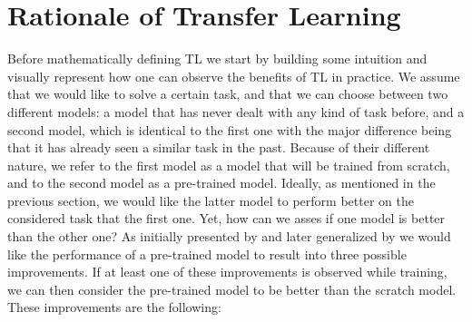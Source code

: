 \section{Rationale of Transfer Learning}
\label{sec:rationale}

Before mathematically defining TL we start by building some intuition and visually represent how one can observe the benefits of TL in practice. We assume that we would like to solve a certain task, and that we can choose between two different models: a model that has never dealt with any kind of task before, and a second model, which is identical to the first one with the major difference being that it has already seen a similar task in the past. Because of their different nature, we refer to the first model as a model that will be trained from scratch, and to the second model as a pre-trained model. Ideally, as mentioned in the previous section, we would like the latter model to perform better on the considered task that the first one. Yet, how can we asses if one model is better than the other one? As initially presented by \citet{langley2006transfer} and later generalized by \citet{lazaric2012transfer} we would like the performance of a pre-trained model to result into three possible improvements. If at least one of these improvements is observed while training, we can then consider the pre-trained model to be better than the scratch model. These improvements are the following:
